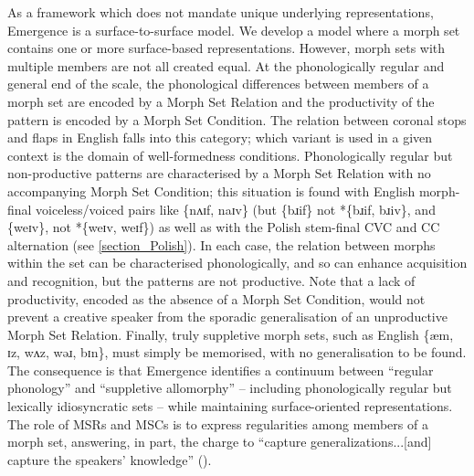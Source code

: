 As a framework which does not mandate unique underlying representations, Emergence is a surface-to-surface model. We develop a model where a morph set contains one or more surface-based representations.  However, morph sets with multiple members are not all created equal. At the phonologically regular and general end of the scale, the phonological differences between members of a morph set are encoded by a Morph Set Relation and the productivity of the pattern is encoded by a Morph Set Condition. The relation between coronal stops and flaps in English falls into this category; which variant is used in a given context is the domain of well-formedness conditions. Phonologically regular but non-productive patterns are characterised by a Morph Set Relation with no accompanying Morph Set Condition; this situation is found with English morph-final voiceless/voiced pairs like \{nʌɪf, naɪv\}  (but \{bɹif\}  not *\{bɹif, bɹiv\}, and \{weɪv\}, not *\{weɪv, weɪf\}) as well as with the Polish stem-final CVC and CC alternation (see \Sec\ref{section_Polish}). In each case, the relation between morphs within the set can be characterised phonologically, and so can enhance acquisition and recognition, but the patterns are not productive. Note that a lack of productivity, encoded as the absence of a Morph Set Condition, would not prevent a creative speaker from the sporadic generalisation of an unproductive Morph Set Relation. Finally, truly suppletive morph sets, such as English \{æm, ɪz, wʌz, wəɹ, bɪn\}, must simply be memorised, with no generalisation to be found. The consequence is that Emergence identifies a continuum between ``regular phonology'' and ``suppletive allomorphy'' -- including phonologically regular but lexically idiosyncratic sets -- while maintaining surface-oriented representations. The role of MSRs and MSCs is to express regularities among members of a morph set, answering, in part,  the charge to ``capture generalizations...[and] capture the speakers' knowledge'' (\citealt[221]{Hyman:2018}).

